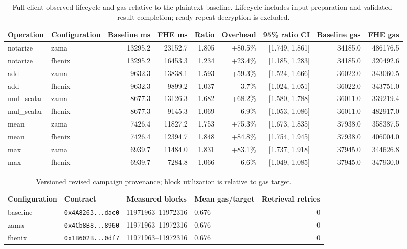 \begin{table}[!t]
\centering\footnotesize
\caption{Full client-observed lifecycle and gas relative to the plaintext baseline. Lifecycle includes input preparation and validated-result completion; ready-repeat decryption is excluded.}
\label{tab:lifecycle-relative-baseline}
\begin{tabular}{llrrrrrrr}
\hline
Operation & Configuration & Baseline ms & FHE ms & Ratio & Overhead & 95\% ratio CI & Baseline gas & FHE gas \\
\hline
notarize & zama & 13295.2 & 23152.7 & 1.805 & +80.5\% & [1.749, 1.861] & 34185.0 & 486176.5 \\
notarize & fhenix & 13295.2 & 16453.3 & 1.234 & +23.4\% & [1.185, 1.283] & 34185.0 & 320492.6 \\
add & zama & 9632.3 & 13838.1 & 1.593 & +59.3\% & [1.524, 1.666] & 36022.0 & 343060.5 \\
add & fhenix & 9632.3 & 9899.2 & 1.037 & +3.7\% & [1.024, 1.051] & 36022.0 & 343751.0 \\
mul\_scalar & zama & 8677.3 & 13126.3 & 1.682 & +68.2\% & [1.580, 1.788] & 36011.0 & 339219.4 \\
mul\_scalar & fhenix & 8677.3 & 9145.3 & 1.069 & +6.9\% & [1.053, 1.086] & 36011.0 & 482917.0 \\
mean & zama & 7426.4 & 11827.2 & 1.753 & +75.3\% & [1.673, 1.835] & 37938.0 & 358387.5 \\
mean & fhenix & 7426.4 & 12394.7 & 1.848 & +84.8\% & [1.754, 1.945] & 37938.0 & 406004.0 \\
max & zama & 6939.7 & 11484.0 & 1.831 & +83.1\% & [1.737, 1.918] & 37945.0 & 344626.8 \\
max & fhenix & 6939.7 & 7284.8 & 1.066 & +6.6\% & [1.049, 1.085] & 37945.0 & 347930.0 \\
\hline
\end{tabular}
\end{table}

\begin{table}[!t]
\centering\footnotesize
\caption{Versioned revised campaign provenance; block utilization is relative to gas target.}
\label{tab:lifecycle-provenance}
\begin{tabular}{llllr}
\hline
Configuration & Contract & Measured blocks & Mean gas/target & Retrieval retries \\
\hline
baseline & \texttt{0x4A8263...dac0} & 11971963--11972316 & 0.676 & 0 \\
zama & \texttt{0x4Cb8B8...8960} & 11971963--11972316 & 0.676 & 0 \\
fhenix & \texttt{0x1B602B...0df7} & 11971963--11972316 & 0.676 & 0 \\
\hline
\end{tabular}
\end{table}

